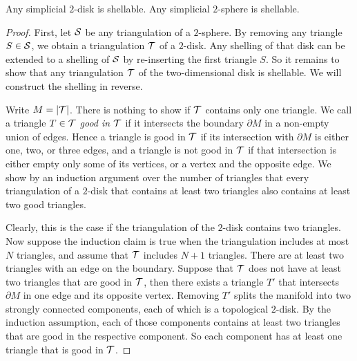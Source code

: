\documentclass[12pt,a4paper]{article}
\newcommand{\todo}[1]{\textcolor{red}{TODO: #1}}
\begin{document}
\begin{lemma}    
    Any simplicial $2$-disk is shellable.
    Any simplicial $2$-sphere is shellable. 
\end{lemma}
\begin{proof}
    First, 
    let ${\mathcal S}$ be any triangulation of a $2$-sphere. 
    By removing any triangle $S \in {\mathcal S}$, we obtain a triangulation ${\mathcal T}$ of a $2$-disk.
    Any shelling of that disk can be extended to a shelling of ${\mathcal S}$ by re-inserting the first triangle $S$.
    So it remains to show that any triangulation ${\mathcal T}$ of the two-dimensional disk is shellable. 
    We will construct the shelling in reverse. 
    
    Write $M = |{\mathcal T}|$. 
    There is nothing to show if ${\mathcal T}$ contains only one triangle. 
    We call a triangle $T \in {\mathcal T}$ \emph{good in ${\mathcal T}$} if it intersects the boundary $\partial M$ in a non-empty union of edges. 
    Hence a triangle is good in ${\mathcal T}$ if its intersection with $\partial M$ is either one, two, or three edges,
    and a triangle is not good in ${\mathcal T}$ if that intersection is either empty only some of its vertices, or a vertex and the opposite edge.
    We show by an induction argument over the number of triangles that every triangulation of a $2$-disk that contains at least two triangles also contains at least two good triangles. 

    Clearly, this is the case if the triangulation of the $2$-disk contains two triangles. 
    Now suppose the induction claim is true when the triangulation includes at most $N$ triangles,
    and assume that ${\mathcal T}$ includes $N+1$ triangles. 
    There are at least two triangles with an edge on the boundary. 
    Suppose that ${\mathcal T}$ does not have at least two triangles that are good in ${\mathcal T}$,
    then there exists a triangle $T'$ that intersects $\partial M$ 
    in one edge and its opposite vertex.
    Removing $T'$ splits the manifold into two strongly connected components, each of which is a topological $2$-disk.
    By the induction assumption, each of those components contains at least two triangles 
    that are good in the respective component. 
    So each component has at least one triangle that is good in ${\mathcal T}$. 

    

\end{proof}
\end{document}
